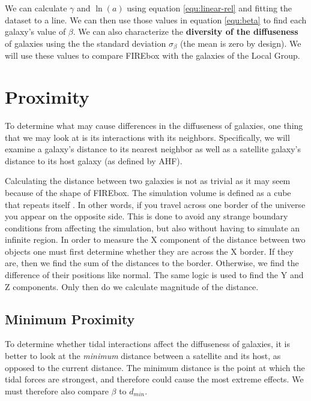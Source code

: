 We can calculate $\gamma$ and $\ln(a)$ using equation \ref{equ:linear-rel} and fitting the dataset to a line. We can then use those values in equation \ref{equ:beta} to find each galaxy's value of $\beta$. We can also characterize the \textbf{diversity of the diffuseness} of galaxies using the the standard deviation $\sigma_\beta$ (the mean is zero by design). We will use these values to compare FIREbox with the galaxies of the Local Group.

\section{Proximity}
To determine what may cause differences in the diffuseness of galaxies, one thing that we may look at is its interactions with its neighbors. Specifically, we will examine a galaxy's distance to its nearest neighbor as well as a satellite galaxy's distance to its host galaxy (as defined by AHF).

Calculating the distance between two galaxies is not as trivial as it may seem because of the shape of FIREbox. The simulation volume is defined as a cube that repeats itself \citep{feldmannFIREboxSimulatingGalaxies2022}. In other words, if you travel across one border of the universe you appear on the opposite side. This is done to avoid any strange boundary conditions from affecting the simulation, but also without having to simulate an infinite region. In order to measure the X component of the distance between two objects one must first determine whether they are across the X border. If they are, then we find the sum of the distances to the border. Otherwise, we find the difference of their positions like normal. The same logic is used to find the Y and Z components. Only then do we calculate magnitude of the distance.

\subsection{Minimum Proximity}

To determine whether tidal interactions affect the diffuseness of galaxies, it is better to look at the \emph{minimum} distance between a satellite and its host, as opposed to the current distance. The minimum distance is the point at which the tidal forces are strongest, and therefore could cause the most extreme effects. We must therefore also compare $\beta$ to $d_{min}$. 
